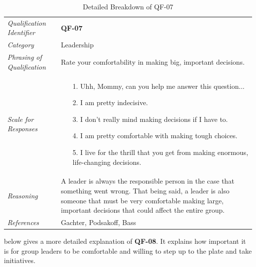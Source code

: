 \documentclass[12pt,letterpaper]{article}
\begin{document}
\begin{table}[H]
	\caption{Detailed Breakdown of QF-07}
	\begin{tabu} to 
		\toprule
		Qualification Identifier & {\bf QF-07}\\
		Category & Leadership \\
		Phrasing of Qualification & Rate your comfortability in making big, important decisions. \\
		Scale for Responses &
		\begin{minipage}[t]{\linewidth}
			\begin{enumerate}
				\item[1.] Uhh, Mommy, can you help me answer this question...
				\item[2.] I am pretty indecisive.
				\item[3.] I don't really mind making decisions if I have to.
				\item[4.] I am pretty comfortable with making tough choices.
				\item[5.] I live for the thrill that you get from making enormous, life-changing decisions.
			\end{enumerate}
		\end{minipage}\\
		Reasoning & A leader is always the responsible person in the case that something went wrong. That being said, a leader is also someone that must be very comfortable making large, important decisions that could affect the entire group.\\
		References & Gachter\cite{gachter}, Podsakoff\cite{podsakoff}, Bass\cite{bass} \\
		\toprule
	\end{tabu}
\end{table}

 below gives a more detailed explanation of {\bf QF-08}. It explains how important it is for group leaders to be comfortable and willing to step up to the plate and take initiatives.
\end{document}
